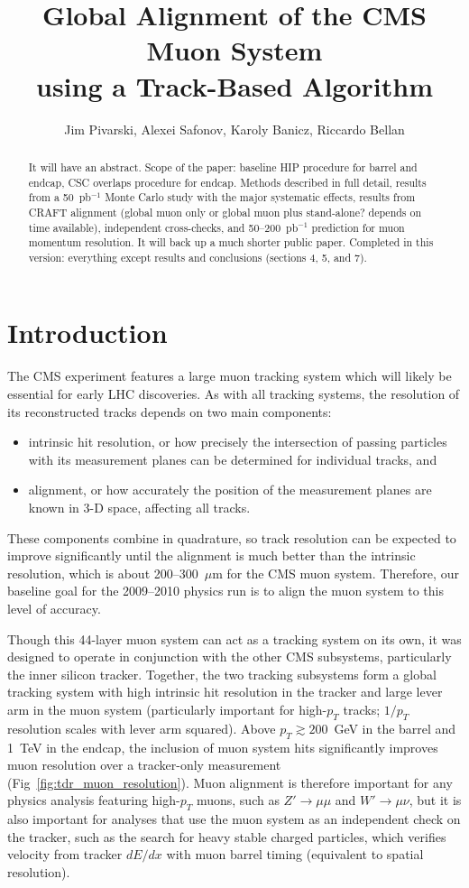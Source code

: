 \documentclass[12pt]{article}
\title{Global Alignment of the CMS Muon System \\ using a Track-Based Algorithm}
\author{Jim Pivarski, Alexei Safonov, Karoly Banicz, Riccardo Bellan}
\begin{document}
\maketitle
\begin{abstract}
It will have an abstract.  Scope of the paper: baseline HIP procedure
for barrel and endcap, CSC overlaps procedure for endcap.  Methods
described in full detail, results from a 50~pb$^{-1}$ Monte Carlo
study with the major systematic effects, results from CRAFT alignment
(global muon only or global muon plus stand-alone? depends on time
available), independent cross-checks, and 50--200~pb$^{-1}$ prediction
for muon momentum resolution.  It will back up a much shorter public
paper.  Completed in this version: everything except results and
conclusions (sections 4, 5, and 7).
\end{abstract}
\pagebreak

\tableofcontents
\pagebreak

\section{Introduction}

The CMS experiment features a large muon tracking system which will
likely be essential for early LHC discoveries.  As with all tracking
systems, the resolution of its reconstructed tracks depends on two
main components:
\begin{itemize}
\item intrinsic hit resolution, or how precisely the intersection of
  passing particles with its measurement planes can be determined for
  individual tracks, and
\item alignment, or how accurately the position of the measurement
  planes are known in 3-D space, affecting all tracks.
\end{itemize}
These components combine in quadrature, so track resolution can be
expected to improve significantly until the alignment is much better
than the intrinsic resolution, which is about 200--300~$\mu$m for the
CMS muon system.  Therefore, our baseline goal for the 2009--2010
physics run is to align the muon system to this level of accuracy.

Though this 44-layer muon system can act as a tracking system on its
own, it was designed to operate in conjunction with the other CMS
subsystems, particularly the inner silicon tracker.  Together, the two
tracking subsystems form a global tracking system with high intrinsic
hit resolution in the tracker and large lever arm in the muon system
(particularly important for high-$p_T$ tracks; $1/p_T$ resolution
scales with lever arm squared).  Above $p_T \gtrsim 200$~GeV in the
barrel and 1~TeV in the endcap, the inclusion of muon system hits
significantly improves muon resolution over a tracker-only measurement
(Fig~\ref{fig:tdr_muon_resolution}).  Muon alignment is therefore
important for any physics analysis featuring high-$p_T$ muons, such as
$Z' \to \mu\mu$ and $W' \to \mu\nu$, but it is also important for
analyses that use the muon system as an independent check on the
tracker, such as the search for heavy stable charged particles, which
verifies velocity from tracker $dE/dx$ with muon barrel timing
(equivalent to spatial resolution).
\end{document}
